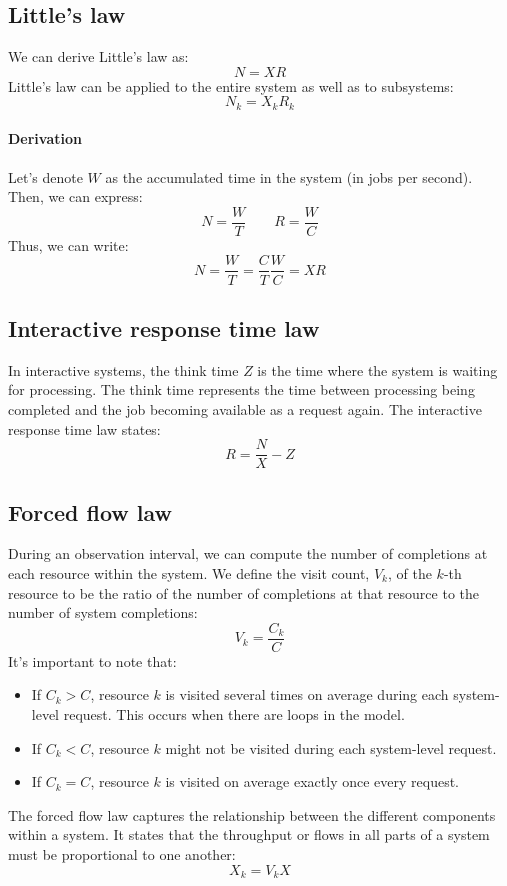 \subsection{Little's law}
We can derive Little's law as:
\[N = XR\]
Little's law can be applied to the entire system as well as to subsystems:
\[N_k= X_kR_k\]

\paragraph*{Derivation}
Let's denote $W$ as the accumulated time in the system (in jobs per second). 
Then, we can express:
\[N=\dfrac{W}{T}  \qquad  R=\dfrac{W}{C}\]
Thus, we can write:
\[N=\dfrac{W}{T}=\dfrac{C}{T}\dfrac{W}{C}=XR\]

\subsection{Interactive response time law}
In interactive systems, the think time $Z$ is the time where the system is waiting for processing. 
The think time represents the time between processing being completed and the job becoming available as a request again. 
The interactive response time law states:
\[R =\dfrac{N}{X}-Z\]

\subsection{Forced flow law}
During an observation interval, we can compute the number of completions at each resource within the system. 
We define the visit count, $V_k$, of the $k$-th resource to be the ratio of the number of completions at that resource to the number of system completions:
\[V_k=\dfrac{C_k}{C}\]
It's important to note that:
\begin{itemize}
    \item If $C_k>C$, resource $k$ is visited several times on average during each system-level request. 
        This occurs when there are loops in the model.
    \item If $C_k<C$, resource $k$ might not be visited during each system-level request.
    \item If $C_k=C$, resource $k$ is visited on average exactly once every request.
\end{itemize}
The forced flow law captures the relationship between the different components within a system. 
It states that the throughput or flows in all parts of a system must be proportional to one another:
\[X_k=V_kX\]

